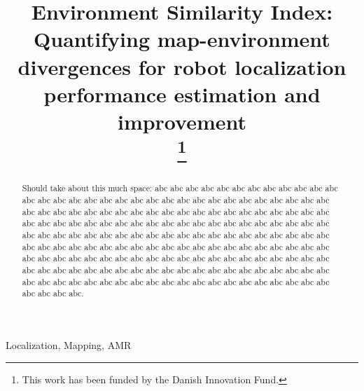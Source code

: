 \documentclass[conference]{IEEEtran}
\begin{document}
\title{Environment Similarity Index: Quantifying map-environment divergences for robot localization performance estimation and improvement\\
\thanks{This work has been funded by the Danish Innovation Fund.}
}

\author{
\and
{}
\and
{}
}

\maketitle

\begin{abstract}
Should take about this much space: \newline
abc abc abc abc abc abc abc abc abc abc abc abc abc abc abc abc abc abc abc abc abc abc abc abc abc abc abc abc abc abc abc abc abc abc abc abc abc abc abc abc abc abc abc abc
abc abc abc abc abc abc abc abc abc abc abc abc abc abc abc abc abc abc abc abc abc abc abc abc abc abc abc abc abc abc abc abc abc abc abc abc abc abc abc abc abc abc abc abc
abc abc abc abc abc abc abc abc abc abc abc abc abc abc abc abc abc abc abc abc abc abc abc abc abc abc abc abc abc abc abc abc abc abc abc abc abc abc abc abc abc abc abc abc
abc abc abc abc abc abc abc abc abc abc abc abc abc abc abc abc abc abc abc abc abc abc abc abc abc abc abc abc abc abc abc abc abc abc abc abc abc abc abc abc abc abc abc abc. 
\newline
\end{abstract}

\begin{IEEEkeywords}
Localization, Mapping, AMR
\end{IEEEkeywords}
\end{document}

